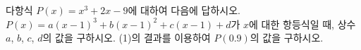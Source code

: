 다항식 $P(x)=x^3+2x-9$에 대하여 다음에 답하시오.
 $P(x)=a(x-1)^3+b(x-1)^2+c(x-1)+d$가 $x$에 대한 항등식일 때, 상수 $a$, $b$, $c$, $d$의 값을 구하시오.
 (1)의 결과를 이용하여 $P(0.9)$의 값을 구하시오.

